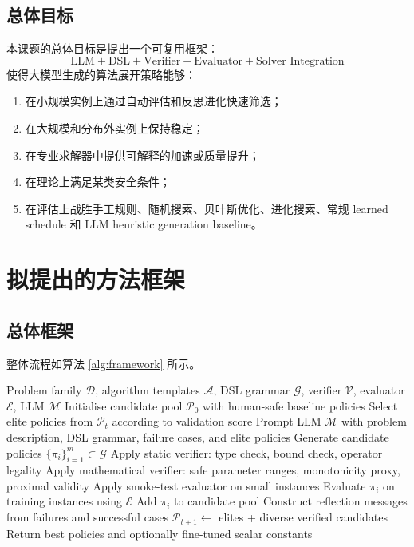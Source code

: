 \documentclass[UTF8,a4paper,12pt,fontset=fandol]{ctexart}
\begin{document}
\subsection{总体目标}

本课题的总体目标是提出一个可复用框架：
\begin{equation}
\boxed{
\text{LLM} + \text{DSL} + \text{Verifier} + \text{Evaluator} + \text{Solver Integration}
}
\end{equation}
使得大模型生成的算法展开策略能够：
\begin{enumerate}[leftmargin=2em]
    \item 在小规模实例上通过自动评估和反思进化快速筛选；
    \item 在大规模和分布外实例上保持稳定；
    \item 在专业求解器中提供可解释的加速或质量提升；
    \item 在理论上满足某类安全条件；
    \item 在评估上战胜手工规则、随机搜索、贝叶斯优化、进化搜索、常规 learned schedule 和 LLM heuristic generation baseline。
\end{enumerate}

\section{拟提出的方法框架}

\subsection{总体框架}

整体流程如算法 \ref{alg:framework} 所示。

\begin{algorithm}[h]
\caption{Language-Guided Verifiable Algorithm Unrolling}
\label{alg:framework}
\begin{algorithmic}[1]
\Require Problem family $\mathcal{D}$, algorithm templates $\mathcal{A}$, DSL grammar $\mathcal{G}$, verifier $\mathcal{V}$, evaluator $\mathcal{E}$, LLM $\mathcal{M}$
\State Initialise candidate pool $\mathcal{P}_0$ with human-safe baseline policies
    \State Select elite policies from $\mathcal{P}_t$ according to validation score
    \State Prompt LLM $\mathcal{M}$ with problem description, DSL grammar, failure cases, and elite policies
    \State Generate candidate policies $\{\pi_i\}_{i=1}^{m} \subset \mathcal{G}$
        \State Apply static verifier: type check, bound check, operator legality
        \State Apply mathematical verifier: safe parameter ranges, monotonicity proxy, proximal validity
        \State Apply smoke-test evaluator on small instances
            \State Evaluate $\pi_i$ on training instances using $\mathcal{E}$
            \State Add $\pi_i$ to candidate pool
        \EndIf
    \EndFor
    \State Construct reflection messages from failures and successful cases
    \State $\mathcal{P}_{t+1} \leftarrow$ elites + diverse verified candidates
\EndFor
\State Return best policies and optionally fine-tuned scalar constants
\end{algorithmic}
\end{algorithm}
\end{document}
